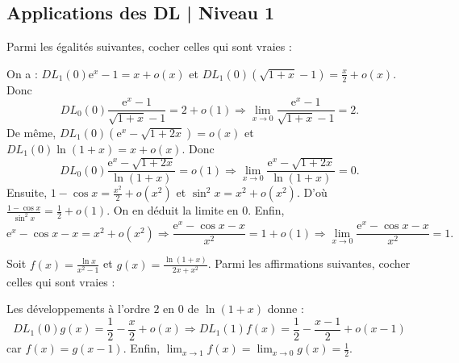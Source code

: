 \subsection{Applications des DL | Niveau 1}

\begin{question}
Parmi les égalités suivantes, cocher celles qui sont vraies :
\begin{answers}  
\end{answers}
\begin{explanations}
On a : $\displaystyle DL_1(0)\mathrm{e}^{x}-1=x+o(x)$ et $\displaystyle DL_1(0)(\sqrt{1+x}-1)=\frac{x}{2}+o(x)$. Donc
$$\displaystyle DL_0(0)\frac{\mathrm{e}^{x}-1}{\sqrt{1+x}-1}=2+o(1)\Rightarrow \displaystyle\lim _{x\to 0}\frac{\mathrm{e}^{x}-1}{\sqrt{1+x}-1}=2.$$
De même, $\displaystyle DL_1(0)(\mathrm{e}^{x}-\sqrt{1+2x})=o(x)$ et $\displaystyle DL_1(0)\ln(1+x)=x+o(x)$. Donc
$$\displaystyle DL_0(0)\frac{\mathrm{e}^{x}-\sqrt{1+2x}}{\ln(1+x)}=o(1)\Rightarrow \lim _{x\to 0}\frac{\mathrm{e}^{x}-\sqrt{1+2x}}{\ln(1+x)}=0.$$ Ensuite, $\displaystyle 1-\cos x=\frac{x^2}{2}+o(x^2)$ et $\displaystyle \sin ^2x=x^2+o(x^2)$. D'où $\displaystyle \frac{1-\cos x}{\sin ^2x}=\frac{1}{2}+o(1)$. On en déduit la limite en $0$. Enfin, 
$$\mathrm{e}^x-\cos x-x=x^2+o(x^2)\Rightarrow \frac{\mathrm{e}^x-\cos x-x}{x^2}=1+o(1)\Rightarrow \lim _{x\to 0}\frac{\mathrm{e}^x-\cos x-x}{x^2}=1.$$
\end{explanations}
\end{question}

\begin{question}
Soit $\displaystyle f(x)=\frac{\ln x}{x^2-1}$ et $\displaystyle g(x)=\frac{\ln (1+x)}{2x+x^2}$. Parmi les affirmations suivantes, cocher celles qui sont vraies :
\begin{answers}  
\end{answers}
\begin{explanations}
Les développements à l'ordre $2$ en $0$ de $\ln (1+x)$ donne :
$$\displaystyle DL_1(0)g(x)=\frac{1}{2}-\frac{x}{2}+o(x) \Rightarrow DL_1(1)f(x)=\frac{1}{2}-\frac{x-1}{2}+o(x-1)$$
car $f(x)=g(x-1)$. Enfin, $\displaystyle \lim _{x\to 1}f(x)=\lim _{x\to 0}g(x)=\frac{1}{2}$.
\end{explanations}
\end{question}


